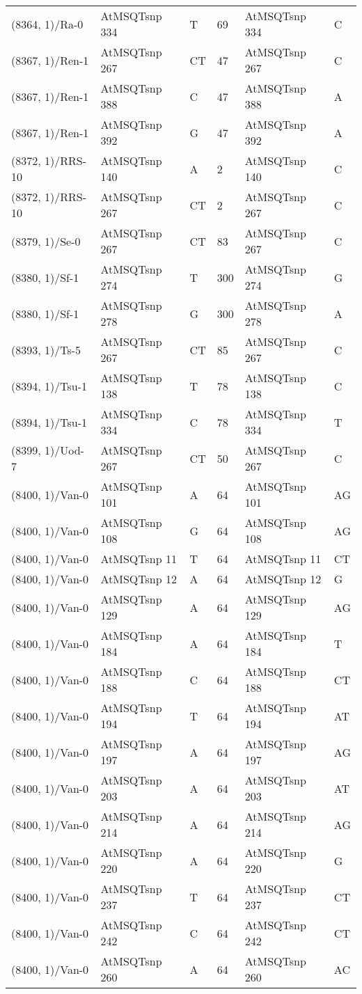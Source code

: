 \begin{center}
\begin{longtable}{|l|l|l|l|l|l|}
(8364, 1)/Ra-0&AtMSQTsnp 334&T&69&AtMSQTsnp 334&C\\
(8367, 1)/Ren-1&AtMSQTsnp 267&CT&47&AtMSQTsnp 267&C\\
(8367, 1)/Ren-1&AtMSQTsnp 388&C&47&AtMSQTsnp 388&A\\
(8367, 1)/Ren-1&AtMSQTsnp 392&G&47&AtMSQTsnp 392&A\\
(8372, 1)/RRS-10&AtMSQTsnp 140&A&2&AtMSQTsnp 140&C\\
(8372, 1)/RRS-10&AtMSQTsnp 267&CT&2&AtMSQTsnp 267&C\\
(8379, 1)/Se-0&AtMSQTsnp 267&CT&83&AtMSQTsnp 267&C\\
(8380, 1)/Sf-1&AtMSQTsnp 274&T&300&AtMSQTsnp 274&G\\
(8380, 1)/Sf-1&AtMSQTsnp 278&G&300&AtMSQTsnp 278&A\\
(8393, 1)/Ts-5&AtMSQTsnp 267&CT&85&AtMSQTsnp 267&C\\
(8394, 1)/Tsu-1&AtMSQTsnp 138&T&78&AtMSQTsnp 138&C\\
(8394, 1)/Tsu-1&AtMSQTsnp 334&C&78&AtMSQTsnp 334&T\\
(8399, 1)/Uod-7&AtMSQTsnp 267&CT&50&AtMSQTsnp 267&C\\
(8400, 1)/Van-0&AtMSQTsnp 101&A&64&AtMSQTsnp 101&AG\\
(8400, 1)/Van-0&AtMSQTsnp 108&G&64&AtMSQTsnp 108&AG\\
(8400, 1)/Van-0&AtMSQTsnp 11&T&64&AtMSQTsnp 11&CT\\
(8400, 1)/Van-0&AtMSQTsnp 12&A&64&AtMSQTsnp 12&G\\
(8400, 1)/Van-0&AtMSQTsnp 129&A&64&AtMSQTsnp 129&AG\\
(8400, 1)/Van-0&AtMSQTsnp 184&A&64&AtMSQTsnp 184&T\\
(8400, 1)/Van-0&AtMSQTsnp 188&C&64&AtMSQTsnp 188&CT\\
(8400, 1)/Van-0&AtMSQTsnp 194&T&64&AtMSQTsnp 194&AT\\
(8400, 1)/Van-0&AtMSQTsnp 197&A&64&AtMSQTsnp 197&AG\\
(8400, 1)/Van-0&AtMSQTsnp 203&A&64&AtMSQTsnp 203&AT\\
(8400, 1)/Van-0&AtMSQTsnp 214&A&64&AtMSQTsnp 214&AG\\
(8400, 1)/Van-0&AtMSQTsnp 220&A&64&AtMSQTsnp 220&G\\
(8400, 1)/Van-0&AtMSQTsnp 237&T&64&AtMSQTsnp 237&CT\\
(8400, 1)/Van-0&AtMSQTsnp 242&C&64&AtMSQTsnp 242&CT\\
(8400, 1)/Van-0&AtMSQTsnp 260&A&64&AtMSQTsnp 260&AC\\

\end{longtable}
\end{center}

